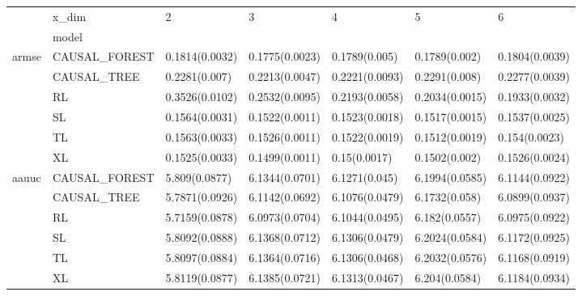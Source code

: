 \begin{tabular}{lllllll}
\toprule
      & x\_dim &               2 &               3 &               4 &               5 &               6 \\
{} & model &                 &                 &                 &                 &                 \\
\midrule
armse & CAUSAL\_FOREST &  0.1814(0.0032) &  0.1775(0.0023) &   0.1789(0.005) &   0.1789(0.002) &  0.1804(0.0039) \\
      & CAUSAL\_TREE &   0.2281(0.007) &  0.2213(0.0047) &  0.2221(0.0093) &   0.2291(0.008) &  0.2277(0.0039) \\
      & RL &  0.3526(0.0102) &  0.2532(0.0095) &  0.2193(0.0058) &  0.2034(0.0015) &  0.1933(0.0032) \\
      & SL &  0.1564(0.0031) &  0.1522(0.0011) &  0.1523(0.0018) &  0.1517(0.0015) &  0.1537(0.0025) \\
      & TL &  0.1563(0.0033) &  0.1526(0.0011) &  0.1522(0.0019) &  0.1512(0.0019) &   0.154(0.0023) \\
      & XL &  0.1525(0.0033) &  0.1499(0.0011) &    0.15(0.0017) &   0.1502(0.002) &  0.1526(0.0024) \\
aauuc & CAUSAL\_FOREST &   5.809(0.0877) &  6.1344(0.0701) &   6.1271(0.045) &  6.1994(0.0585) &  6.1144(0.0922) \\
      & CAUSAL\_TREE &  5.7871(0.0926) &  6.1142(0.0692) &  6.1076(0.0479) &   6.1732(0.058) &  6.0899(0.0937) \\
      & RL &  5.7159(0.0878) &  6.0973(0.0704) &  6.1044(0.0495) &   6.182(0.0557) &  6.0975(0.0922) \\
      & SL &  5.8092(0.0888) &  6.1368(0.0712) &  6.1306(0.0479) &  6.2024(0.0584) &  6.1172(0.0925) \\
      & TL &  5.8097(0.0884) &  6.1364(0.0716) &  6.1306(0.0468) &  6.2032(0.0576) &  6.1168(0.0919) \\
      & XL &  5.8119(0.0877) &  6.1385(0.0721) &  6.1313(0.0467) &   6.204(0.0584) &  6.1184(0.0934) \\
\bottomrule
\end{tabular}
